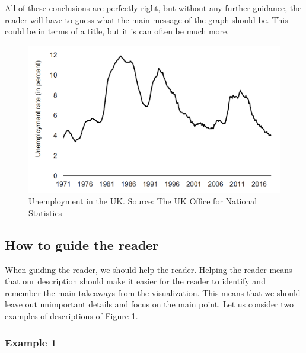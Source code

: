 \documentclass[]{book}
\begin{document}
All of these conclusions are perfectly right, but without any further guidance, the reader will have to guess what the main message of the graph should be. This could be in terms of a title, but it is can often be much more.

\begin{figure}

{\centering \includegraphics[width=0.8\linewidth]{_resources/chapter_describe/ex} 

}

\caption{Unemployment in the UK. Source: The UK Office for National Statistics}\label{fig:desc1}
\end{figure}

\hypertarget{how-to-guide-the-reader}{%
\subsection{How to guide the reader}\label{how-to-guide-the-reader}}

When guiding the reader, we should help the reader. Helping the reader means that our description should make it easier for the reader to identify and remember the main takeaways from the visualization. This means that we should leave out unimportant details and focus on the main point. Let us consider two examples of descriptions of Figure \ref{fig:desc1}.

\hypertarget{example-1}{%
\subsubsection*{Example 1}\label{example-1}}
\end{document}
